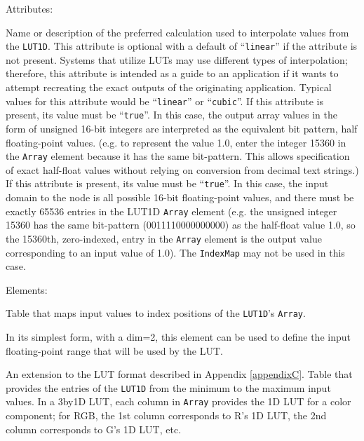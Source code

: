 Attributes:
\begin{xmlfields}
	\xmlitem[interpolation][optional] Name or description of the preferred calculation used to interpolate values from the \texttt{LUT1D}. This attribute is optional with a default of ``\texttt{linear}'' if the attribute is not present. Systems that utilize LUTs may use different types of interpolation; therefore, this attribute is intended as a guide to an application if it wants to attempt recreating the exact outputs of the originating application. Typical values for this attribute would be ``\texttt{linear}'' or ``\texttt{cubic}''.
	\xmlitem[rawHalfs][optional] If this attribute is present, its value must be ``\texttt{true}''. In this case, the output array values in the form of unsigned 16-bit integers are interpreted as the equivalent bit pattern, half floating-point values. (e.g.  to represent the value 1.0, enter the integer 15360 in the \texttt{Array} element because it has the same bit-pattern. This allows specification of exact half-float values without relying on conversion from decimal text strings.)
	\xmlitem[halfDomain][optional] If this attribute is present, its value must be ``\texttt{true}''. In this case, the input domain to the node is all possible 16-bit floating-point values, and there must be exactly 65536 entries in the LUT1D \texttt{Array} element (e.g. the unsigned integer 15360 has the same bit-pattern (0011110000000000) as the half-float value 1.0, so the 15360th, zero-indexed, entry in the \texttt{Array} element is the output value corresponding to an input value of 1.0). The \texttt{IndexMap} may not be used in this case.
\end{xmlfields}

Elements:
\begin{xmlfields}
	\xmlitem[IndexMap][optional] Table that maps input values to index positions of the \texttt{LUT1D}'s \texttt{Array}.\par
		In its simplest form, with a dim=2, this element can be used to define the input floating-point range that will be used by the LUT.\par
		An extension to the LUT format described in Appendix \ref{appendixC}.
	\xmlitem[Array][required] Table that provides the entries of the \texttt{LUT1D} from the minimum to the maximum input values. In a 3by1D LUT, each column in \texttt{Array} provides the 1D LUT for a color component; for RGB, the 1st column corresponds to R’s 1D LUT, the 2nd column corresponds to G’s 1D LUT, etc.
\end{xmlfields}



